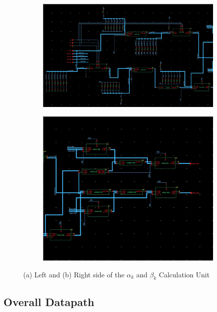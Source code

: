 \documentclass[letterpaper, 11pt]{article}
\begin{document}
	
	\begin{figure}[ht!]
		\centering
		\begin{subfigure}[b]{.558\linewidth}
			\includegraphics[width=\textwidth]{report_pics/ak_bk_left.jpg}
			\caption{}
			\label{fig25a}
		\end{subfigure}
		\begin{subfigure}[b]{.4\linewidth}
			\includegraphics[width=\textwidth]{report_pics/ak_bk_right.jpg}
			\caption{}
			\label{fig25b}
		\end{subfigure}
		\caption{(a) Left and (b) Right side of the $\alpha_k$ and $\beta_k$ Calculation Unit}
	\end{figure}
	\newpage
	\subsection{Overall Datapath}
	\label{subsec:datapath}
	
\end{document}
